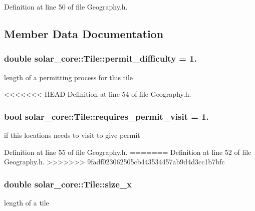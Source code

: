 Definition at line 50 of file Geography.\+h.



\subsection{Member Data Documentation}
\hypertarget{classsolar__core_1_1_tile_ac4cdbb55f06b95bd8c4a11a25d0b6635}{}
\subsubsection[{permit\+\_\+difficulty}]{\setlength{\rightskip}{0pt plus 5cm}double solar\+\_\+core\+::\+Tile\+::permit\+\_\+difficulty = 1.}\label{classsolar__core_1_1_tile_ac4cdbb55f06b95bd8c4a11a25d0b6635}
length of a permitting process for this tile 

<<<<<<< HEAD
Definition at line 54 of file Geography.\+h.

\hypertarget{classsolar__core_1_1_tile_a489ba61bbe83f143b98d8a866cf06f13}{}
\subsubsection[{requires\+\_\+permit\+\_\+visit}]{\setlength{\rightskip}{0pt plus 5cm}bool solar\+\_\+core\+::\+Tile\+::requires\+\_\+permit\+\_\+visit = 1.}\label{classsolar__core_1_1_tile_a489ba61bbe83f143b98d8a866cf06f13}
if this locations needs to visit to give permit 

Definition at line 55 of file Geography.\+h.
=======
Definition at line 52 of file Geography.\+h.
>>>>>>> 9fadf023062505cb443534457ab9d4d3cc1b7bfc

\hypertarget{classsolar__core_1_1_tile_ae8615b87d6d0c614de01b497fa63c27b}{}
\subsubsection[{size\+\_\+x}]{\setlength{\rightskip}{0pt plus 5cm}double solar\+\_\+core\+::\+Tile\+::size\+\_\+x}\label{classsolar__core_1_1_tile_ae8615b87d6d0c614de01b497fa63c27b}
length of a tile 

